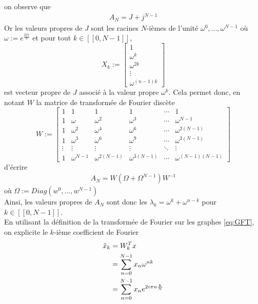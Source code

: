 \documentclass[11pt]{article}
\begin{document}
on observe que 
\begin{align}
    A_N = J + j^{N-1}
\end{align}
Or les valeurs propres de $J$ sont les racines $N$-ièmes de l'unité $\omega^0,...,\omega^{N-1}$ où $\omega := e^{\frac{2i\pi}{n}}$ et pour tout $k\in [\![0,N-1]\!]$, \[X_k := \begin{bmatrix} 1 \\\omega^k \\ \omega^{2k}\\ \vdots\\ \omega^{(n-1)k}\end{bmatrix}\]
est vecteur propre de $J$ associé à la valeur propre $\omega^k$.
Cela permet donc, en notant $W$ la matrice de transformée de Fourier discète
\[ W :=
\begin{bmatrix}
1&1&1&1&\cdots &1 \\
1&\omega&\omega^2&\omega^3&\cdots&\omega^{N-1} \\
1&\omega^2&\omega^4&\omega^6&\cdots&\omega^{2(N-1)}\\ 1&\omega^3&\omega^6&\omega^9&\cdots&\omega^{3(N-1)}\\
\vdots&\vdots&\vdots&\vdots&\ddots&\vdots\\
1&\omega^{N-1}&\omega^{2(N-1)}&\omega^{3(N-1)}&\cdots&\omega^{(N-1)(N-1)}
\end{bmatrix}
\]
d'écrire
\begin{align}
    A_N = W(\Omega+\Omega^{N-1})W^{-1}
\end{align}
où $\Omega := Diag(w^0,...,w^{N-1})$\\
Ainsi, les valeurs propres de $A_N$ sont donc les $\lambda_k = \omega^k+\omega^{n-k}$ pour $k \in [\![0,N-1]\!]$.\\
En utilisant la définition de la transformée de Fourier sur les graphes \ref{eq:GFT}, on explicite le $k$-ième coefficient de Fourier
\begin{align}
    \Tilde{x}_k &= W_k^Tx\\
    &= \sum_{n=0}^{N-1}x_n\omega^{nk} \\
    &= \sum_{n=0}^{N-1}x_n e^{2i\pi n\frac{k}{N}}
\end{align}
\end{document}
